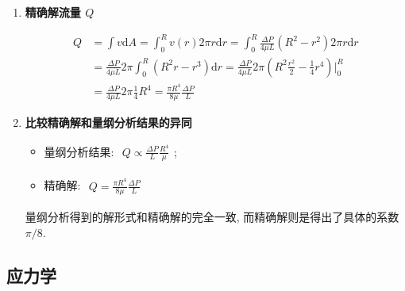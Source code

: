 \documentclass[../../main.tex]{subfiles}
\begin{document}
\begin{enumerate}
    \item \textbf{精确解流量 $Q$}
    
$$
\begin{aligned}
Q &= \int v\mathrm{d}A = \int_{0}^{R}v(r) 2\pi r\mathrm{d}r = \int_{0}^{R} \frac{\Delta P}{4\mu L}(R^{2} - r^{2}) 2\pi r\mathrm{d}r\\
&= \frac{\Delta P}{4\mu L}2\pi \int_{0}^{R} (R^{2}r - r^{3})\mathrm{d}r = \frac{\Delta P}{4\mu L}2\pi (R^{2}\frac{r^{2}}{2} - \frac{1}{4}r^{4})\Big|_{0}^{R}\\
&= \frac{\Delta P}{4\mu L}2\pi \frac{1}{4}R^{4} = \frac{\pi R^{4}}{8\mu }\frac{\Delta P}{L}
\end{aligned}
$$

    \item \textbf{比较精确解和量纲分析结果的异同}

    \begin{itemize}
        \item 量纲分析结果: $\begin{aligned}Q \propto \frac{\Delta P}{L}  \frac{R^{4}}{\mu}\end{aligned}$;
        \item 精确解: $\begin{aligned}Q = \frac{\pi R^{4}}{8\mu }\frac{\Delta P}{L}\end{aligned}$
    \end{itemize}

量纲分析得到的解形式和精确解的完全一致, 而精确解则是得出了具体的系数 $\pi/8$. 
\end{enumerate}

\subsection{应力学}
\end{document}
